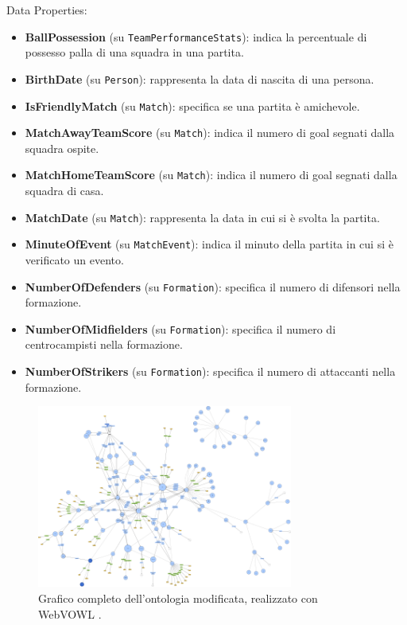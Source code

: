 \documentclass[11pt]{report} %
\begin{document}
\newpage

Data Properties:

\begin{itemize}
    \item \textbf{BallPossession} (su \texttt{TeamPerformanceStats}): indica la percentuale di possesso palla di una squadra in una partita.
    \item \textbf{BirthDate} (su \texttt{Person}): rappresenta la data di nascita di una persona.
    \item \textbf{IsFriendlyMatch} (su \texttt{Match}): specifica se una partita è amichevole.
    \item \textbf{MatchAwayTeamScore} (su \texttt{Match}): indica il numero di goal segnati dalla squadra ospite.
    \item \textbf{MatchHomeTeamScore} (su \texttt{Match}): indica il numero di goal segnati dalla squadra di casa.
    \item \textbf{MatchDate} (su \texttt{Match}): rappresenta la data in cui si è svolta la partita.
    \item \textbf{MinuteOfEvent} (su \texttt{MatchEvent}): indica il minuto della partita in cui si è verificato un evento.
    \item \textbf{NumberOfDefenders} (su \texttt{Formation}): specifica il numero di difensori nella formazione.
    \item \textbf{NumberOfMidfielders} (su \texttt{Formation}): specifica il numero di centrocampisti nella formazione.
    \item \textbf{NumberOfStrikers} (su \texttt{Formation}): specifica il numero di attaccanti nella formazione.
\end{itemize}

\begin{figure}[H]
    \begin{center}
        \includegraphics[width=0.75\textwidth]{FootOntologyPlus.rdf.png}
    \end{center}
    \caption{Grafico completo dell'ontologia modificata, realizzato con WebVOWL \cite{webvowl,foot}.}
\end{figure}
\end{document}
